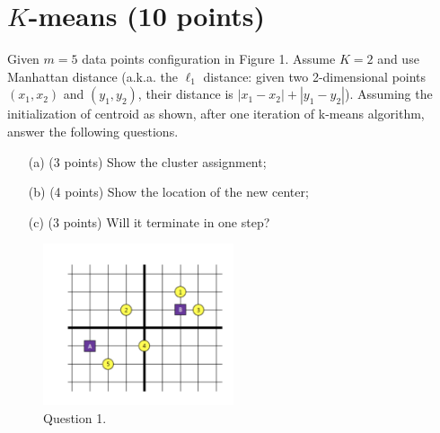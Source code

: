 \documentclass[a4paper,12pt,fleqn]{article}
\begin{document}
% 	
% 	

\clearpage

\section{\bf $K$-means (10 points)}

Given $m = 5$ data points configuration in Figure 1. Assume $K = 2$ and use Manhattan distance (a.k.a. the $\ell_1$ distance: given two 2-dimensional points $(x_1, x_2)$ and $(y_1, y_2)$, their distance is $|x_1 - x_2| + |y_1 - y_2|$).  Assuming the initialization of centroid as shown, after one iteration of k-means algorithm, answer the following questions. 

\begin{enumerate}
\item[(a)] (3 points) Show the cluster assignment;
\item[(b)] (4 points) Show the location of the new center;
\item[(c)] (3 points) Will it terminate in one step?
\end{enumerate}

\begin{figure}[h!]
\begin{center}
\includegraphics[width = 0.5\textwidth]{./fig/points.png}
\end{center}
\caption{Question 1.}
\end{figure}
\end{document}
